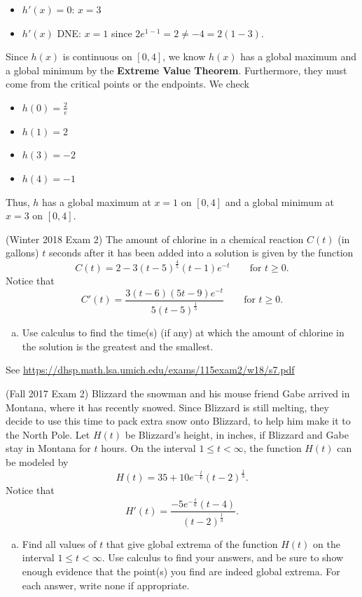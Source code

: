 \documentclass[11pt]{exam}
\begin{document}
\begin{questions}
\begin{solution}
\begin{itemize}
  \item \(h'(x) = 0\): \(x=3\)
  \item \(h'(x)\) DNE: \(x=1\) since \(2e^{1-1} = 2 \neq -4 = 2(1-3)\).
  \end{itemize}
  Since \(h(x)\) is continuous
  on \([0,4]\), we know \(h(x)\) has a global maximum and a global
  minimum by the \textbf{Extreme Value Theorem}. Furthermore, they
  must come from the critical points or the endpoints. We check
  \begin{itemize}
  \item \(h(0) = \frac{2}{e}\)
  \item \(h(1) = 2\)
  \item \(h(3) = -2\)
  \item \(h(4) = -1\)
  \end{itemize}
  Thus, \(h\) has a global maximum at \(x=1\) on \([0,4]\) and a
  global minimum at \(x=3\) on \([0,4]\).
\end{solution}
\question (Winter 2018 Exam 2) %
The amount of chlorine in a chemical reaction \(C(t)\) (in gallons) \(t\) seconds after it has been added into a solution is given by the function
$$C(t)=2-3(t-5)^{\frac{4}{5}}(t-1)e^{-t} \qquad \textrm{for } t \geqslant 0.$$
Notice that
$$C'(t)=\frac{3(t-6)(5t-9)e^{-t}}{5(t-5)^{\frac{1}{5}}} \qquad \textrm{for } t \geqslant 0.$$
\begin{enumerate}[(a)]
\item Use calculus to find the time(s) (if any) at which the amount of chlorine in the solution is the greatest and the smallest. 
\end{enumerate}
\begin{solution}
  See \href{https://dhsp.math.lsa.umich.edu/exams/115exam2/w18/s7.pdf}{https://dhsp.math.lsa.umich.edu/exams/115exam2/w18/s7.pdf}
\end{solution}
\question (Fall 2017 Exam 2) %
  Blizzard the snowman and his mouse friend Gabe arrived in Montana, where it has recently snowed. Since Blizzard is still melting, they decide to use this time to pack extra snow onto Blizzard, to help him make it to the North Pole. Let $H(t)$ be Blizzard's height, in inches, if Blizzard and Gabe stay in Montana for $t$ hours. On the interval $1 \leqslant t < \infty$, the function $H(t)$ can be modeled by
$$H(t) = 35 + 10 e^{-\frac{t}{6}}(t-2)^{\frac{1}{3}}.$$
Notice that
$$H'(t) = \frac{-5e^{-\frac{t}{6}}(t-4)}{(t-2)^{\frac{1}{3}}}.$$
\begin{enumerate}[(a)]
\item Find all values of $t$ that give global extrema of the function $H(t)$ on the interval $1 \leqslant t < \infty$. Use calculus to find your answers, and be sure to show enough evidence that the point(s) you find are indeed global extrema. For each answer, write none if appropriate.

\end{enumerate}
\end{questions}
\end{document}
